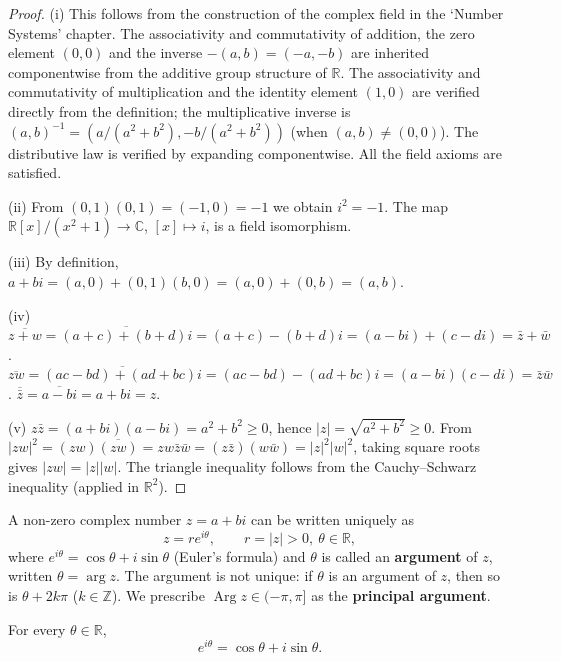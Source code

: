 \begin{proof}
(i) This follows from the construction of the complex field in the `Number Systems' chapter. The associativity and commutativity of addition, the zero element $(0,0)$ and the inverse $-(a,b) = (-a,-b)$ are inherited componentwise from the additive group structure of $\mathbb{R}$. The associativity and commutativity of multiplication and the identity element $(1,0)$ are verified directly from the definition; the multiplicative inverse is $(a,b)^{-1} = (a/(a^2+b^2), -b/(a^2+b^2))$ (when $(a,b) \neq (0,0)$). The distributive law is verified by expanding componentwise. All the field axioms are satisfied.

(ii) From $(0,1)(0,1) = (-1,0) = -1$ we obtain $i^2 = -1$. The map $\mathbb{R}[x]/(x^2+1) \to \mathbb{C}$, $[x] \mapsto i$, is a field isomorphism.

(iii) By definition, $a + bi = (a,0) + (0,1)(b,0) = (a,0) + (0,b) = (a,b)$.

(iv) $\overline{z+w} = \overline{(a+c) + (b+d)i} = (a+c) - (b+d)i = (a - bi) + (c - di) = \bar{z} + \bar{w}$. $\overline{zw} = \overline{(ac-bd) + (ad+bc)i} = (ac-bd) - (ad+bc)i = (a-bi)(c-di) = \bar{z}\bar{w}$. $\overline{\bar{z}} = \overline{a-bi} = a+bi = z$.

(v) $z\bar{z} = (a+bi)(a-bi) = a^2 + b^2 \ge 0$, hence $|z| = \sqrt{a^2+b^2} \ge 0$. From $|zw|^2 = (zw)\overline{(zw)} = zw\bar{z}\bar{w} = (z\bar{z})(w\bar{w}) = |z|^2|w|^2$, taking square roots gives $|zw| = |z||w|$. The triangle inequality follows from the Cauchy--Schwarz inequality (applied in $\mathbb{R}^2$).
\end{proof}

\begin{definition}\label{def:ca_polar_argument}
A non-zero complex number $z = a + bi$ can be written uniquely as
\[
z = r e^{i\theta}, \qquad r = |z| > 0,\ \theta \in \mathbb{R},
\]
where $e^{i\theta} = \cos\theta + i \sin\theta$ (Euler's formula) and $\theta$ is called an \textbf{argument} of $z$, written $\theta = \arg z$. The argument is not unique: if $\theta$ is an argument of $z$, then so is $\theta + 2k\pi$ ($k \in \mathbb{Z}$). We prescribe $\operatorname{Arg} z \in (-\pi, \pi]$ as the \textbf{principal argument}.
\end{definition}

\begin{theorem}\label{thm:ca_euler_formula}
For every $\theta \in \mathbb{R}$,
\[
e^{i\theta} = \cos\theta + i \sin\theta.
\]
\end{theorem}

